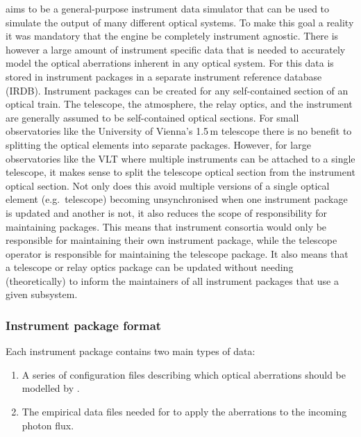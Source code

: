 \ScopeSim{} aims to be a general-purpose instrument data simulator
that can be used to simulate the output of many different optical
systems.  To make this goal a reality it was mandatory that the
\scopesim{} engine be completely instrument agnostic.  There is
however a large amount of instrument specific data that is needed to
accurately model the optical aberrations inherent in any optical
system.  For \ScopeSim{} this data is stored in instrument packages in
a separate instrument reference database (IRDB).  Instrument packages
can be created for any self-contained section of an optical train.
The telescope, the atmosphere, the relay optics, and the instrument
are generally assumed to be self-contained optical sections.  For
small observatories like the University of Vienna's 1.5\,m telescope
there is no benefit to splitting the optical elements into separate
packages.  However, for large observatories like the VLT where
multiple instruments can be attached to a single telescope, it makes
sense to split the telescope optical section from the instrument
optical section.  Not only does this avoid multiple versions of a
single optical element (e.g.~telescope) becoming unsynchronised when
one instrument package is updated and another is not, it also reduces
the scope of responsibility for maintaining packages.  This means that
instrument consortia would only be responsible for maintaining their
own instrument package, while the telescope operator is responsible
for maintaining the telescope package.  It also means that a telescope
or relay optics package can be updated without needing (theoretically)
to inform the maintainers of all instrument packages that use a given
subsystem.


\subsubsection{Instrument package format}
\label{instrument-package-format}

Each instrument package contains two main types of data:
\begin{enumerate}
\item A series of configuration files describing which optical
  aberrations should be modelled by \scopesim{}.

\item The empirical data files needed for \scopesim{} to apply the
  aberrations to the incoming photon flux.
\end{enumerate}


